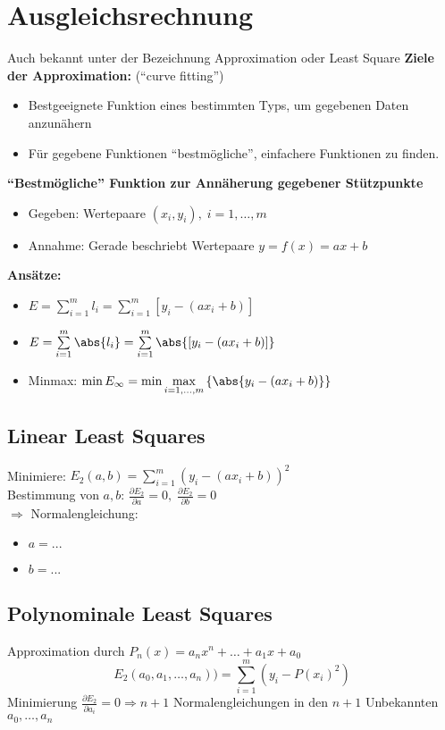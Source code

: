 \chapter{Ausgleichsrechnung}
Auch bekannt unter der Bezeichnung Approximation oder Least Square
\textbf{Ziele der Approximation:} ("`curve fitting"')
\begin{itemize}
\item Bestgeeignete Funktion eines bestimmten Typs, um gegebenen Daten anzunähern
\item Für gegebene Funktionen "`bestmögliche"', einfachere Funktionen zu finden. 
\end{itemize}

\textbf{"`Bestmögliche"' Funktion zur Annäherung gegebener Stützpunkte}
\begin{itemize}
\item Gegeben: Wertepaare $(x_i,y_i),\;i=1,\ldots ,m$
\item Annahme: Gerade beschriebt Wertepaare $y = f(x) = ax+b$ 
\end{itemize}

\textbf{Ansätze:} 
\begin{itemize}
\item $E = \sum\limits_{i=1}^m l_i = \sum\limits_{i=1}^m\left[y_i-(ax_i+b)\right]$
\item $E = \sum\limits_{i=1}^m \abs{l_i} = \sum\limits_{i=1}^m\abs{\left[y_i-(ax_i+b)\right]}$
\item Minmax: $\min E_\infty = \min\max\limits_{i=1,\ldots,m}\left\lbrace\abs{y_i-(ax_i+b)}\right\rbrace$
\end{itemize}

\section{Linear Least Squares}
Minimiere: $E_2(a,b) = \sum\limits_{i=1}^m\left(y_i-(ax_i+b)\right)^2$\\
Bestimmung von $a,b$: $\frac{\partial E_2}{\partial a} = 0,\;\frac{\partial E_2}{\partial b} = 0$\\
$\Rightarrow$ Normalengleichung:
\begin{itemize}
\item $a = ...$
\item $b = ...$
\end{itemize}

\section{Polynominale Least Squares}
Approximation durch $P_n(x) = a_nx^n + \ldots + a_1x + a_0$
\begin{equation}
E_2(a_0,a_1,\ldots,a_n)) = \sum\limits_{i=1}^m(y_i - P(x_i)^2) 
\end{equation}
Minimierung $\frac{\partial E_2}{\partial a_i} = 0\Rightarrow n+1$ Normalengleichungen in den $n+1$ Unbekannten $a_0,\ldots,a_n$

